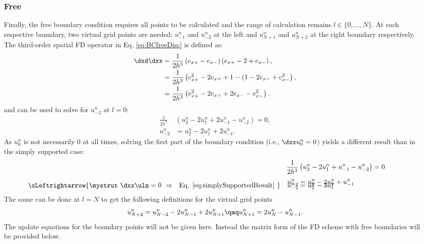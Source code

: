 \subsubsection{Free}
Finally, the free boundary condition requires all points to be calculated and the range of calculation remains $l\in\{0, \hdots, N\}$. At each respective boundary, two virtual grid points are needed: $u_{-1}^n$ and $u_{-2}^n$ at the left and $u_{N+1}^n$ and $u_{N+2}^n$ at the right boundary respectively.
The third-order spatial FD operator in Eq. \eqref{eq:BCfreeDisc} is defined as:
\begin{align}
    \dxd\dxx &= \frac{1}{2h^3}\left(e_{x+}-e_{x-}\right)\left(e_{x+}-2+e_{x-}\right),\nonumber\\
    &=\frac{1}{2h^3}\left(e_{x+}^2 - 2e_{x+} + 1 - (1 - 2e_{x-} + e_{x-}^2\right),\nonumber\\
    &=\frac{1}{2h^3}\left(e_{x+}^2 - 2e_{x+} + 2e_{x-} -e_{x-}^2\right).
\end{align}
and can be used to solve for $u_{-2}^n$ at $l=0$:
\begin{align*}
    \frac{1}{2h^3} &\left(u_2^n - 2 u_1^n + 2u_{-1}^n - u_{-2}^n\right) = 0,\\%
    u_{-2}^n &= u_2^n - 2 u_1^n + 2u_{-1}^n.
\end{align*}
As $u_0^n$ is not necessarily $0$ at all times, solving the first part of the boundary condition (i.e., $\dxx u_0^n = 0$) yields a different result than in the simply supported case:
\begin{align*}
    \frac{1}{2h^3} &\left(u_2^n - 2 u_1^n + u_{-1}^n - u_{-2}^n\right) = 0\\[0.25em]
    u_{-2}^n &= u_2^n - 2 u_1^n + u_{-1}^n\\[-1em]
    \!\!\!\!\!\!\!\!\!\!\!\!\!\!\!\xLeftrightarrow{\mystrut\ \dxx \uln = 0\ \Rightarrow\ \text{ Eq. \eqref{eq:simplySupportedResult}}\ }
    \quad u_{-2}^n &= u_2^n - 3 u_1^n 
\end{align*}
The same can be done at $l=N$ to get the following definitions for the virtual grid points
\begin{equation*}
    u_{N+2}^n = u_{N-2}^n - 2 u_{N-1}^n + 2u_{N+1}^n
    \qaq u_{N+1}^n = 2u_N^n - u_{N-1}^n.
\end{equation*}
The update equations for the boundary points will not be given here. Instead the matrix form of the FD scheme with free boundaries will be provided below. 

